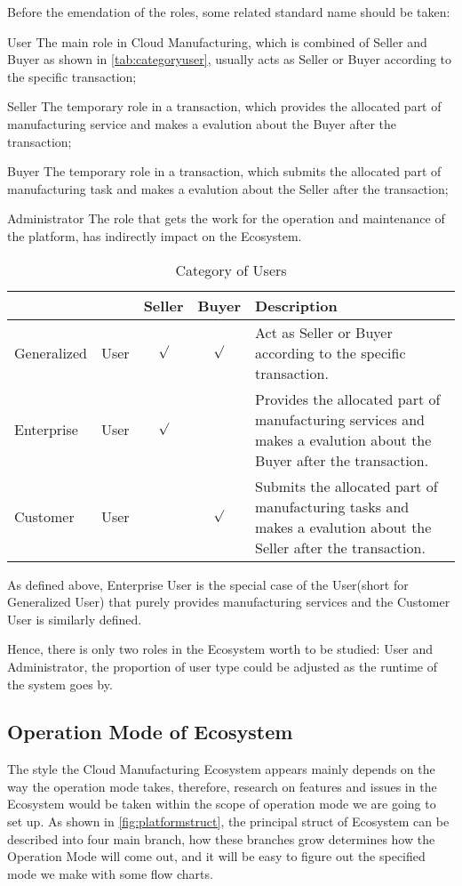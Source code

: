 Before the emendation of the roles, some related standard name should be taken:
\begin{asparadesc}
\item[User] The main role in Cloud Manufacturing, which is combined of Seller and Buyer as shown in \autoref{tab:categoryuser}, usually acts as Seller or Buyer according to the specific transaction;
\item[Seller] The temporary role in a transaction, which provides the allocated part of manufacturing service and makes a evalution about the Buyer after the transaction;
\item[Buyer] The temporary role in a transaction, which submits the allocated part of manufacturing task and makes a evalution about the Seller after the transaction;
\item[Administrator] The role that gets the work for the operation and maintenance of the platform, has indirectly impact on the Ecosystem.
\end{asparadesc}
\begin{table}[htbp]
  \centering\small
  \caption{Category of Users}
    \begin{tabularx}{\textwidth}{llccX}
    \toprule
        &  & Seller & Buyer & Description \\
    \midrule
    Generalized & User & $\surd$ & $\surd$ & Act as Seller or Buyer according to the specific transaction. \\
    Enterprise & User & $\surd$ & &  Provides the allocated part of manufacturing services and makes a evalution about the Buyer after the transaction. \\
    Customer & User& & $\surd$ &  Submits the allocated part of manufacturing tasks and makes a evalution about the Seller after the transaction.\\
    \bottomrule
    \end{tabularx}%
  \label{tab:categoryuser}%
\end{table}%
As defined above, Enterprise User is the special case of the User(short for Generalized User) that purely provides manufacturing services and the Customer User is similarly defined.

Hence, there is only two roles in the Ecosystem worth to be studied: User and Administrator, the proportion of user type could be adjusted as the runtime of the system goes by.

\subsection{Operation Mode of Ecosystem}
The style the Cloud Manufacturing Ecosystem appears mainly depends on the way the operation mode takes, therefore, research on features and issues in the Ecosystem would be taken within the scope of operation mode we are going to set up. As shown in \autoref{fig:platformstruct}, the principal struct of Ecosystem can be described into four main branch, how these branches grow determines how the Operation Mode will come out, and it will be easy to figure out the specified mode we make with some flow charts.

